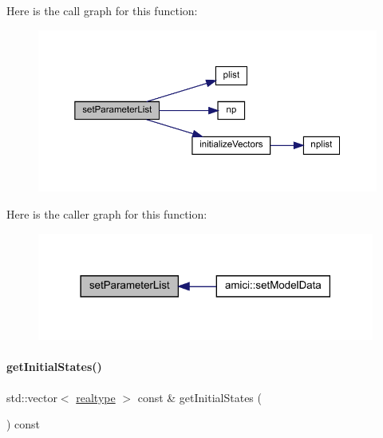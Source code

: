Here is the call graph for this function\+:
\nopagebreak
\begin{figure}[H]
\begin{center}
\leavevmode
\includegraphics[width=350pt]{classamici_1_1_model_a2afe974183e4bccaf746f6409941fe8f_cgraph}
\end{center}
\end{figure}
Here is the caller graph for this function\+:
\nopagebreak
\begin{figure}[H]
\begin{center}
\leavevmode
\includegraphics[width=314pt]{classamici_1_1_model_a2afe974183e4bccaf746f6409941fe8f_icgraph}
\end{center}
\end{figure}
\mbox{\label{classamici_1_1_model_a34b007de55db268995bdc788accdc57d}} 
\paragraph{\texorpdfstring{get\+Initial\+States()}{getInitialStates()}}
{\footnotesize\ttfamily std\+::vector$<$ \mbox{\hyperlink{namespaceamici_a1bdce28051d6a53868f7ccbf5f2c14a3}{realtype}} $>$ const  \& get\+Initial\+States (\begin{DoxyParamCaption}{ }\end{DoxyParamCaption}) const}

